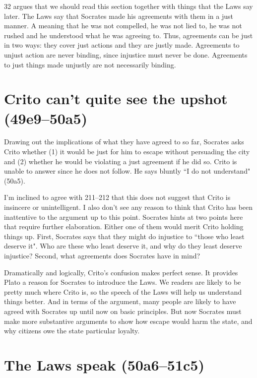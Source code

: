 \documentclass[11pt]{article}
\begin{document}
\citet{kraut1984} 32 argues that we should read this section together with things that the Laws say later.  The Laws say that Socrates made his agreements with them in a just manner.  A  meaning that he was not compelled, he was not lied to, he was not rushed and he understood what he was agreeing to.  Thus, agreements can be just in two ways: they cover just actions and they are justly made.  Agreements to unjust action are never binding, since injustice must never be done.  Agreements to just things made unjustly are not necessarily binding.

\section{Crito can't quite see the upshot (49e9--50a5)}

Drawing out the implications of what they have agreed to so far, Socrates asks Crito whether (1) it would be just for him to escape without persuading the city and (2) whether he would be violating a just agreement if he did so.  Crito is unable to answer since he does not follow.  He says bluntly ``I do not understand" (50a5).

I'm inclined to agree with \citet{brickhouse2004} 211--212 that this does not suggest that Crito is insincere or unintelligent.  I also don't see any reason to think that Crito has been inattentive to the argument up to this point.  Socrates hints at two points here that require further elaboration.  Either one of them would merit Crito holding things up.  First, Socrates says that they might do injustice to ``those who least deserve it". Who are these who least deserve it, and why do they least deserve injustice?  Second, what agreements does Socrates have in mind?

Dramatically and logically, Crito's confusion makes perfect sense.  It provides Plato a reason for Socrates to introduce the Laws.  We readers are likely to be pretty much where Crito is, so the speech of the Laws will help us understand things better.  And in terms of the argument, many people are likely to have agreed with Socrates up until now on basic principles.  But now Socrates must make more substantive arguments to show how escape would harm the state, and why citizens owe the state particular loyalty.

\section{The Laws speak (50a6--51c5)}
\end{document}
